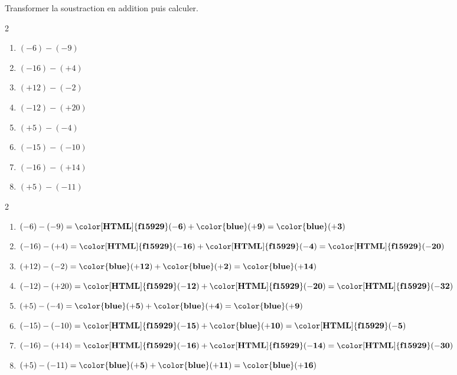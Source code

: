 \begin{exercice*}
    Transformer la soustraction en addition puis calculer.
    \begin{multicols}2
        \begin{enumerate}            
            \item $ (-6) - (-9) $
            \item $ (-16) - (+4) $
            \item $ (+12) - (-2) $
            \item $ (-12) - (+20) $
            \item $ (+5) - (-4) $
            \item $ (-15) - (-10) $
            \item $ (-16) - (+14) $
            \item $ (+5) - (-11) $
        \end{enumerate}
    \end{multicols}

\end{exercice*}
\begin{corrige}
    \phantom{rrr}    
    \begin{multicols}2
        \begin{enumerate}
            \item $ (-6) - (-9) = \mathbf{{\color[HTML]{f15929}(-6)}} + \mathbf{{\color{blue}(+9)}} = \mathbf{{\color{blue}(+3)}} $
            \item $ (-16) - (+4) = \mathbf{{\color[HTML]{f15929}(-16)}} + \mathbf{{\color[HTML]{f15929}(-4)}} = \mathbf{{\color[HTML]{f15929}(-20)}} $
            \item $ (+12) - (-2) = \mathbf{{\color{blue}(+12)}} + \mathbf{{\color{blue}(+2)}} = \mathbf{{\color{blue}(+14)}} $
            \item $ (-12) - (+20) = \mathbf{{\color[HTML]{f15929}(-12)}} + \mathbf{{\color[HTML]{f15929}(-20)}} = \mathbf{{\color[HTML]{f15929}(-32)}} $
            \item $ (+5) - (-4) = \mathbf{{\color{blue}(+5)}} + \mathbf{{\color{blue}(+4)}} = \mathbf{{\color{blue}(+9)}} $
            \item $ (-15) - (-10) = \mathbf{{\color[HTML]{f15929}(-15)}} + \mathbf{{\color{blue}(+10)}} = \mathbf{{\color[HTML]{f15929}(-5)}} $
            \item $ (-16) - (+14) = \mathbf{{\color[HTML]{f15929}(-16)}} + \mathbf{{\color[HTML]{f15929}(-14)}} = \mathbf{{\color[HTML]{f15929}(-30)}} $
            \item $ (+5) - (-11) = \mathbf{{\color{blue}(+5)}} + \mathbf{{\color{blue}(+11)}} = \mathbf{{\color{blue}(+16)}} $
        \end{enumerate}
    \end{multicols}
\end{corrige}